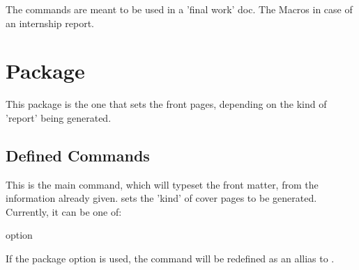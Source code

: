 \documentclass[article,nogeometry,english,tocdepth=3,secdepth=3]{ufrgscca} %
\begin{document}
\begin{tsremark}[N.B.:]
The commands \tsobj{\advisor,\coadvisor,\examiner,\altexaminer} are meant to be used in a 'final work' doc. The Macros \tsobj{\internship,\tutor,\supervisor} in case of an internship report.
\end{tsremark}


\section{ Package}
This package is the one that sets the front pages, depending on the kind of 'report' being generated. 


\subsection{Defined Commands}
\begin{codedescribe}[code,new=2023/11/18]{\MakeCoverPages}
	\begin{codesyntax}%
	\end{codesyntax}
This is the main command, which will typeset the front matter, from the information already given.  sets the 'kind' of cover pages to be generated. Currently, it can be one of:
\end{codedescribe}
\begin{describelist}{option}
\end{describelist}
\begin{tsremark}[N.B.:]
 If the package option  is used, the command \tsobj{\maketitle} will be redefined as an allias to \tsobj{\MakeCoverPages}.
\end{tsremark}
\end{document}
